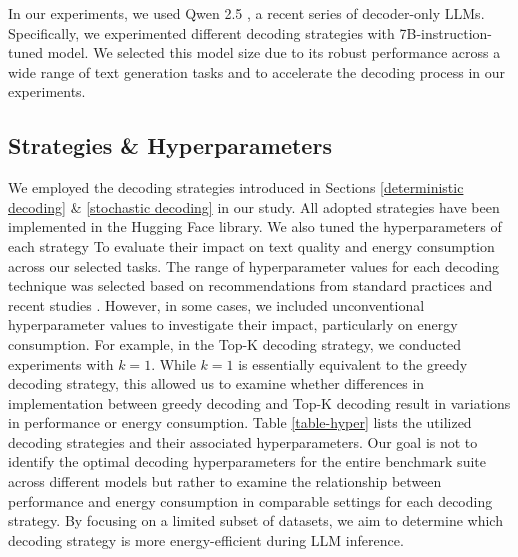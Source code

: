 In our experiments, we used Qwen 2.5 \cite{qwen2.5}, a recent series of decoder-only LLMs. Specifically, we experimented different decoding strategies with 7B-instruction-tuned model. We selected this model size due to its robust performance across a wide range of text generation tasks and to accelerate the decoding process in our experiments. 

\subsection{Strategies \& Hyperparameters}  

We employed the decoding strategies introduced in Sections \ref{deterministic decoding} \& \ref{stochastic decoding} in our study. All adopted strategies have been implemented in the Hugging Face \cite{transformers} library. We also tuned the hyperparameters of each strategy To evaluate their impact on text quality and energy consumption across our selected tasks. The range of hyperparameter values for each decoding technique was selected based on recommendations from standard practices and recent studies \cite{one,two}. However, in some cases, we included unconventional hyperparameter values to investigate their impact, particularly on energy consumption. For example, in the Top-K decoding strategy, we conducted experiments with \( k = 1\). While \( k = 1\) is essentially equivalent to the greedy decoding strategy, this allowed us to examine whether differences in implementation between greedy decoding and Top-K decoding result in variations in performance or energy consumption. Table \ref{table-hyper} lists the utilized decoding strategies and their associated hyperparameters. Our goal is not to identify the optimal decoding hyperparameters for the entire benchmark suite across different models but rather to examine the relationship between performance and energy consumption in comparable settings for each decoding strategy. By focusing on a limited subset of datasets, we aim to determine which decoding strategy is more energy-efficient during LLM inference.

 



